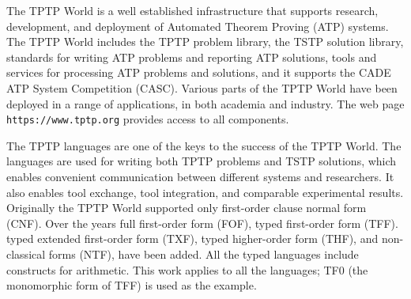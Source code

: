 \documentclass[letterpaper]{article}
\newcommand{\smalltt}[1]{\small \texttt{#1}}
\begin{document}
The TPTP World \cite{Sut17} is a well established infrastructure that supports research, 
development, and deployment of Automated Theorem Proving (ATP) systems.
The TPTP World includes the TPTP problem library,
the TSTP solution library,
standards for writing ATP problems and reporting ATP solutions,
tools and services for processing ATP problems and solutions,
and it supports the CADE ATP System Competition (CASC).
Various parts of the TPTP World have been deployed in a range of applications,
in both academia and industry.
The web page {\smalltt{https://www.tptp.org}} provides access to all components.

The TPTP languages \cite{Sut22-IGPL} are one of the keys to the success of the TPTP World.
The languages are used for writing both TPTP problems and TSTP solutions, which enables convenient 
communication between different systems and researchers. 
It also enables tool exchange, tool integration, and comparable experimental results.
Originally the TPTP World supported only first-order clause normal form (CNF).
Over the years full first-order form (FOF),
typed first-order form (TFF).
typed extended first-order form (TXF),
typed higher-order form (THF),
and non-classical forms (NTF),
have been added.
All the typed languages include constructs for arithmetic.
This work applies to all the languages; TF0 (the monomorphic form of TFF) \cite{SS+12} 
is used as the example.
\end{document}

